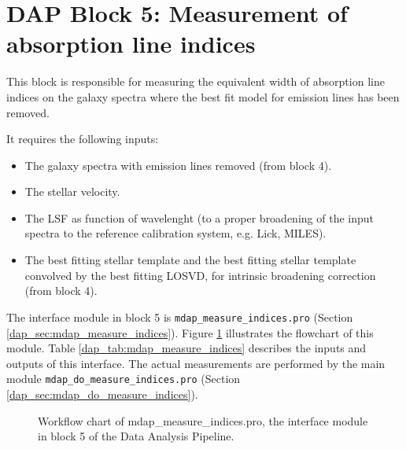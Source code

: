 \documentclass[11pt]{book}
\begin{document}


\section{DAP Block 5: Measurement of absorption line indices}
\label{dap_sec:block5}

This block is responsible for measuring the equivalent width of
absorption line indices on the galaxy spectra where the best fit model
for emission lines has been removed.

It requires the following inputs:
\begin{itemize}
 
\item The galaxy spectra with emission lines removed (from block 4).

\item The stellar velocity.

  \item The LSF as function of wavelenght (to a proper
broadening of the input spectra to the reference calibration system,
e.g. Lick, MILES).

\item The best fitting stellar template and the best fitting stellar
  template convolved by the best fitting LOSVD, for intrinsic
  broadening correction (from block 4).

\end{itemize}

The interface module in block 5 is {\tt mdap\_measure\_indices.pro}
(Section \ref{dap_sec:mdap_measure_indices}). Figure
\ref{dap_fig:block5} illustrates the flowchart of this module.  Table
\ref{dap_tab:mdap_measure_indices} describes the inputs and outputs of
this interface. The actual measurements are performed by the main
module {\tt mdap\_do\_measure\_indices.pro} (Section
\ref{dap_sec:mdap_do_measure_indices}).


\begin{figure}
\begin{center}
\caption{Workflow chart of mdap\_measure\_indices.pro, the interface
  module in block 5 of the Data Analysis Pipeline.}
 \label{dap_fig:block5}
\end{center}
\end{figure}
\end{document}
